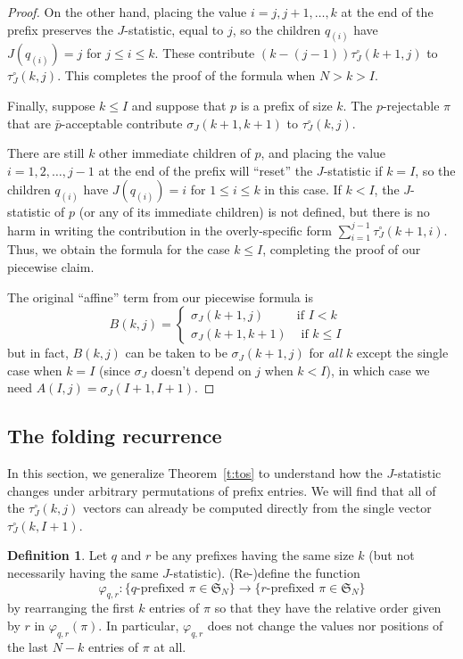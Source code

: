 \documentclass[11pt]{amsart}   %
\theoremstyle{definition}
\newtheorem{definition}[theorem]{Definition}
\theoremstyle{remark}
\numberwithin{equation}{section}
\theoremstyle{theorem}
\newcommand{\f}[0]{\varphi}
\newcommand{\SN}{\mathfrak{S}}
\begin{document}
\begin{proof}
On the other hand, placing the value $i = j, j+1, \ldots, k$ at the end of the
prefix preserves the $J$-statistic, equal to $j$, so the children $q_{(i)}$
have $J(q_{(i)}) = j$ for $j \leq i \leq k$.  These contribute $(k-(j-1))
\tau^\circ_J(k+1, j)$ to $\tau^\circ_J(k, j)$.  This completes the proof of the
formula when $N > k > I$.

Finally, suppose $k \leq I$ and suppose that $p$ is a prefix of size $k$.  The
$p$-rejectable $\pi$ that are $\bar{p}$-acceptable contribute $\sigma_J(k+1,
k+1)$ to $\tau^\circ_J(k, j)$.

There are still $k$ other immediate children of $p$, and placing the value $i =
1, 2, \ldots, j-1$ at the end of the prefix will ``reset'' the $J$-statistic if
$k = I$, so the children $q_{(i)}$ have $J(q_{(i)}) = i$ for $1 \leq i \leq k$
in this case.  If $k < I$, the $J$-statistic of $p$ (or any of its immediate
children) is not defined, but there is no harm in writing the contribution in
the overly-specific form $\sum_{i=1}^{j-1} \tau^\circ_J(k+1, i)$.  Thus, we
obtain the formula for the case $k \leq I$, completing the proof of our
piecewise claim.

The original ``affine'' term from our piecewise formula is 
\[ B(k, j) = \begin{cases} \sigma_J(k+1, j) & \text{if $I < k$} \\ \sigma_J(k+1, k+1) & \text{ if $k \leq I$ } \end{cases} \]
but in fact, $B(k, j)$ can be taken to be $\sigma_J(k+1, j)$ for {\em all} $k$
except the single case when $k = I$ (since $\sigma_J$ doesn't depend on $j$
when $k < I$), in which case we need $A(I, j) = \sigma_J(I+1, I+1)$.
\end{proof}

\bigskip
\subsection{The folding recurrence}\label{s:fold}

In this section, we generalize Theorem~\ref{t:tos} to understand how the $J$-statistic changes under arbitrary permutations of prefix entries.  We will find that all of the $\tau^\circ_J(k, j)$ vectors can already be computed directly from the single vector $\tau^\circ_J(k, I+1)$.

\begin{definition}
Let $q$ and $r$ be any prefixes having the same size $k$ (but not necessarily having the same $J$-statistic).  (Re-)define the function
\[ \f_{q,r}: \{ \text{$q$-prefixed } \pi \in \SN_N \} \rightarrow \{ \text{$r$-prefixed } \pi \in \SN_N\} \] 
by rearranging the first $k$ entries of $\pi$ so that they have the relative order given by $r$ in $\f_{q,r}(\pi)$.
In particular, $\f_{q,r}$ does not change the values nor positions of the last $N-k$ entries of $\pi$ at all.
\end{definition}
\end{document}
